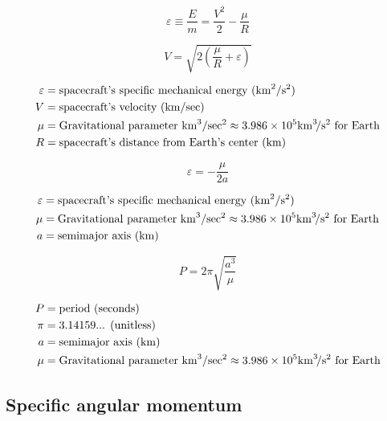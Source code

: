 \documentclass{article}
\newcommand{\myvarmukm}{\mu &= \text{Gravitational parameter \si{\kilo\meter\cubed\per\sec\squared}} \approx 3.986 \times 10^5 \si{\kilo\meter\cubed\per\second\squared} \text{ for Earth}}
\newcommand{\myvarv}{V &= \text{spacecraft's velocity (\si{\kilo\meter\per\sec})}}
\newcommand{\myvarepsilon}{\varepsilon &= \text{spacecraft's specific mechanical energy (\si{\kilo\meter\squared\per\second\squared)}}}
\newcommand{\myvara}{a &= \text{semimajor axis (\si{\kilo\meter})}}
\begin{document}
\begin{multicols}{3}
	\begin{equation*}
	\boxed{\varepsilon \equiv \dfrac{E}{m} = \dfrac{V^2}{2} - \dfrac{\mu}{R}}
	\end{equation*}

	\begin{equation*}
	\boxed{V = \sqrt{2(\dfrac{\mu}{R} + \varepsilon)}}
	\end{equation*}

	\vfill\null
	\columnbreak

	\begin{align*}
	\myvarepsilon\\
	\myvarv\\
	\myvarmukm \\
	R &= \text{spacecraft's distance from Earth's center (\si{\kilo\meter})}\\
	\end{align*}
\end{multicols}

\begin{multicols}{3}
	\begin{equation*}
	\boxed{\varepsilon = - \dfrac{\mu}{2a}}
	\end{equation*}

	\vfill\null
	\columnbreak

	\begin{align*}
	\myvarepsilon\\
	\myvarmukm \\
	\myvara\\
	\end{align*}
\end{multicols}

\begin{multicols}{3}
	\begin{equation*}
	\boxed{P = 2\pi\sqrt{\dfrac{a^3}{\mu}}}
	\end{equation*}

	\vfill\null
	\columnbreak

	\begin{align*}
	P &= \text{period (seconds)}\\
	\pi &= \text{3.14159... (unitless)}\\
	\myvara\\
	\myvarmukm \\
	\end{align*}
\end{multicols}

\subsection{Specific angular momentum}
\end{document}
